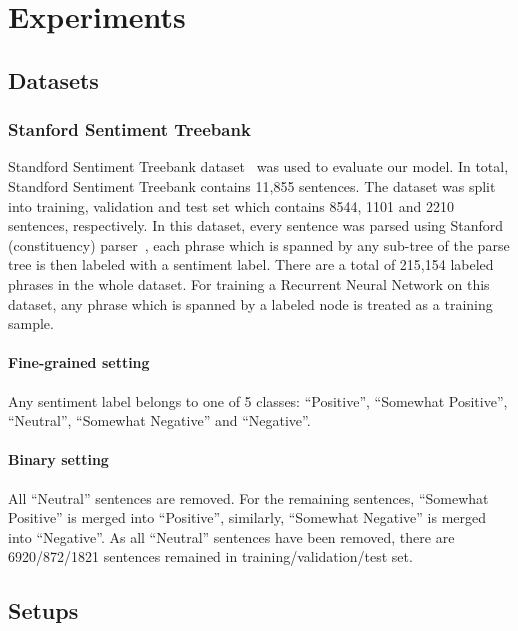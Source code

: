 \section{Experiments}
\subsection{Datasets}
\subsubsection{Stanford Sentiment Treebank} \label{sec:sst}
Standford Sentiment Treebank dataset~\cite{socher2013recursive} was used to evaluate our model.
In total, Standford Sentiment Treebank contains 11,855 sentences.
The dataset was split into training, validation and test set which contains 8544, 1101 and 2210 sentences, respectively.
In this dataset, every sentence was parsed using Stanford (constituency) parser~\cite{socher2013recursive}, each phrase which is spanned by any sub-tree of the parse tree is then labeled with a sentiment label.
There are a total of 215,154 labeled phrases in the whole dataset.
For training a Recurrent Neural Network on this dataset, any phrase which is spanned by a labeled node is treated as a training sample.
\paragraph{Fine-grained setting} Any sentiment label belongs to one of 5 classes: ``Positive'', ``Somewhat Positive'', ``Neutral'', ``Somewhat Negative'' and ``Negative''.
\paragraph{Binary setting} All ``Neutral'' sentences are removed.
For the remaining sentences, ``Somewhat Positive'' is merged into ``Positive'', similarly, ``Somewhat Negative'' is merged into ``Negative''.
As all ``Neutral'' sentences have been removed, there are 6920/872/1821 sentences remained in training/validation/test set.
\subsection{Setups}
